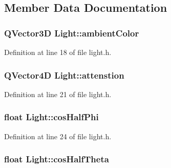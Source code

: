 \subsection{Member Data Documentation}
\hypertarget{class_light_a4613929744a5de8828ed660fca90366f}{}
\subsubsection[{ambient\+Color}]{\setlength{\rightskip}{0pt plus 5cm}Q\+Vector3\+D Light\+::ambient\+Color\hspace{0.3cm}{\ttfamily [protected]}}\label{class_light_a4613929744a5de8828ed660fca90366f}


Definition at line 18 of file light.\+h.

\hypertarget{class_light_aee062fbeac40aa71642450f016aac961}{}
\subsubsection[{attenstion}]{\setlength{\rightskip}{0pt plus 5cm}Q\+Vector4\+D Light\+::attenstion\hspace{0.3cm}{\ttfamily [protected]}}\label{class_light_aee062fbeac40aa71642450f016aac961}


Definition at line 21 of file light.\+h.

\hypertarget{class_light_ab91ec48042aa2f542231a7225b0e55fe}{}
\subsubsection[{cos\+Half\+Phi}]{\setlength{\rightskip}{0pt plus 5cm}float Light\+::cos\+Half\+Phi\hspace{0.3cm}{\ttfamily [protected]}}\label{class_light_ab91ec48042aa2f542231a7225b0e55fe}


Definition at line 24 of file light.\+h.

\hypertarget{class_light_a4c5aa51610a4c60375ddc247fe71c422}{}
\subsubsection[{cos\+Half\+Theta}]{\setlength{\rightskip}{0pt plus 5cm}float Light\+::cos\+Half\+Theta\hspace{0.3cm}{\ttfamily [protected]}}\label{class_light_a4c5aa51610a4c60375ddc247fe71c422}


